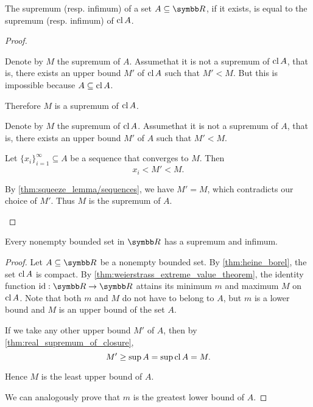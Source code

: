 \begin{proposition}\label{thm:real_supremum_of_closure}
  The supremum (resp. infimum) of a set \( A \subseteq \R \), if it exists, is equal to the supremum (resp. infimum) of \( \operatorname{cl} A \).
\end{proposition}
\begin{proof}
  \begin{description}
    \Implies Denote by \( M \) the supremum of \( A \). Assume\LEM that it is not a supremum of \( \operatorname{cl} A \), that is, there exists an upper bound \( M' \) of \( \operatorname{cl} A \) such that \( M' < M \). But this is impossible because \( A \subseteq \operatorname{cl} A \).

    Therefore \( M \) is a supremum of \( \operatorname{cl} A \).

    \ImpliedBy Denote by \( M \) the supremum of \( \operatorname{cl} A \). Assume\LEM that it is not a supremum of \( A \), that is, there exists an upper bound \( M' \) of \( A \) such that \( M' < M \).

    Let \( \{ x_i \}_{i=1}^\infty \subseteq A \) be a sequence that converges to \( M \). Then
    \begin{equation*}
      x_i < M' < M.
    \end{equation*}

    By \cref{thm:squeeze_lemma/sequences}, we have \( M' = M \), which contradicts our choice of \( M' \). Thus \( M \) is the supremum of \( A \).
  \end{description}
\end{proof}

\begin{proposition}\label{thm:real_bounded_set_has_supremum}
  Every nonempty bounded set in \( \R \) has a supremum and infimum.
\end{proposition}
\begin{proof}
  Let \( A \subseteq \R \) be a nonempty bounded set. By \cref{thm:heine_borel}, the set \( \operatorname{cl} A \) is compact. By \cref{thm:weierstrass_extreme_value_theorem}, the identity function \( \Id: \R \to \R \) attains its minimum \( m \) and maximum \( M \) on \( \operatorname{cl} A \). Note that both \( m \) and \( M \) do not have to belong to \( A \), but \( m \) is a lower bound and \( M \) is an upper bound of the set \( A \).

  If we take any other upper bound \( M' \) of \( A \), then by \cref{thm:real_supremum_of_closure},
  \begin{equation*}
    M' \geq \sup A = \sup \operatorname{cl} A = M.
  \end{equation*}

  Hence \( M \) is the least upper bound of \( A \).

  We can analogously prove that \( m \) is the greatest lower bound of \( A \).
\end{proof}
